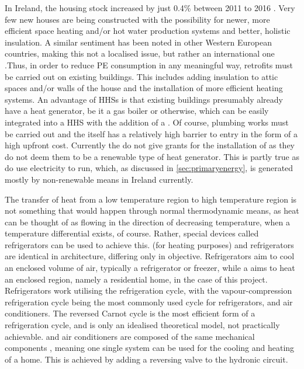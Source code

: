 In Ireland, the housing stock increased by just 0.4\% between 2011 to 2016 \cite{cso_2020}. Very few new houses are being constructed with the possibility for newer, more efficient space heating and/or hot water production systems and better, holistic insulation. A similar sentiment has been noted in other Western European countries, making this not a localised issue, but rather an international one \cite{klein_numerical_2014, dongellini_influence_2021} .Thus, in order to reduce \ac{PE} consumption in any meaningful way, retrofits must be carried out on existing buildings. This includes adding insulation to attic spaces and/or walls of the house and the installation of more efficient heating systems. An advantage of \acp{HHS} is that existing buildings presumably already have a heat generator, be it a gas boiler or otherwise, which can be easily integrated into a \ac{HHS} with the addition of a \HP. Of course, plumbing works must be carried out and the \HP itself has a relatively high barrier to entry in the form of a high upfront cost. Currently the \citeauthor{seai_2020} do not give grants for the installation of \HPs as they do not deem them to be a renewable type of heat generator. This is partly true as \HPs do use electricity to run, which, as discussed in \cref{sec:primaryenergy}, is generated mostly by non-renewable means in Ireland currently.  

The transfer of heat from a low temperature region to high temperature region is not something that would happen through normal thermodynamic means, as heat can be thought of as flowing in the direction of decreasing temperature, when a temperature differential exists, of course. Rather, special devices called refrigerators can be used to achieve this. \HPs (for heating purposes) and refrigerators are identical in architecture, differing only in objective. Refrigerators aim to cool an enclosed volume of air, typically a refrigerator or freezer, while a \HP aims to heat an enclosed region, namely a residential home, in the case of this project. Refrigerators work utilising the refrigeration cycle, with the vapour-compression refrigeration cycle being the most commonly used cycle for refrigerators, \HPs and air conditioners. The reversed Carnot cycle is the most efficient form of a refrigeration cycle, and is only an idealised theoretical model, not practically achievable.
\HPs and air conditioners are composed of the same mechanical components \cite{cengel_thermo_2020}, meaning one single system can be used for the cooling and heating of a home. This is achieved by adding a reversing valve to the hydronic circuit.

